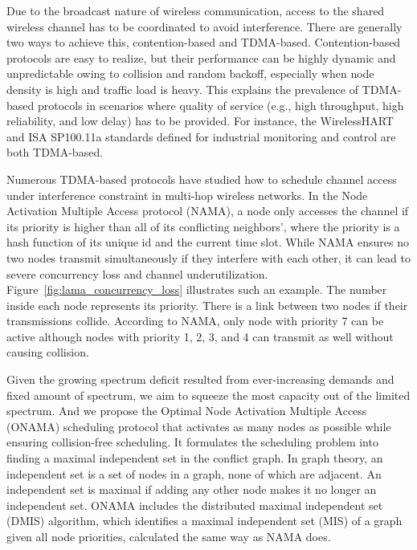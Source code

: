 \documentclass[conference]{IEEEtran}
\begin{document}
Due to the broadcast nature of wireless communication, access to the shared wireless channel has to be coordinated to avoid interference. There are generally two ways to achieve this, contention-based and TDMA-based. Contention-based protocols are easy to realize, but their performance can be highly dynamic and unpredictable owing to collision and random backoff, especially when node density is high and traffic load is heavy. This explains the prevalence of TDMA-based protocols in scenarios where quality of service (e.g., high throughput, high reliability, and low delay) has to be provided. For instance, the WirelessHART \cite{wirelesshart} and ISA SP100.11a \cite{isa100} standards defined for industrial monitoring and control are both TDMA-based.



Numerous TDMA-based protocols have studied how to schedule channel access under interference constraint in multi-hop wireless networks. In the Node Activation Multiple Access protocol (NAMA)\cite{nama:bao:mobicom01}, a node only accesses the channel if its priority is higher than all of its conflicting neighbors', where the priority is a hash function of its unique id and the current time slot. While NAMA ensures no two nodes transmit simultaneously if they interfere with each other, it can lead to severe concurrency loss and channel underutilization. Figure~\ref{fig:lama_concurrency_loss} illustrates such an example. The number inside each node represents its priority. There is a link between two nodes if their transmissions collide. According to NAMA, only node with priority 7 can be active although nodes with priority 1, 2, 3, and 4 can transmit as well without causing collision.


Given the growing spectrum deficit resulted from ever-increasing demands and fixed amount of spectrum, we aim to squeeze the most capacity out of the limited spectrum. And we propose the Optimal Node Activation Multiple Access (ONAMA) scheduling protocol that activates as many nodes as possible while ensuring collision-free scheduling. It formulates the scheduling problem into finding a maximal independent set in the conflict graph. In graph theory, an independent set is a set of nodes in a graph, none of which are adjacent. An independent set is maximal if adding any other node makes it no longer an independent set. ONAMA includes the distributed maximal independent set (DMIS) algorithm, which identifies a maximal independent set (MIS) of a graph given all node priorities, calculated the same way as NAMA does. 
\end{document}
